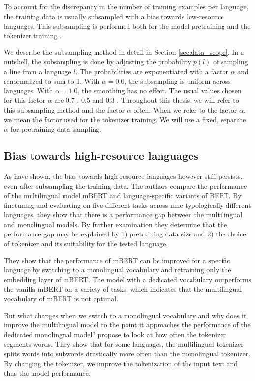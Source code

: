 To account for the discrepancy in the number of training examples per language, the training data is usually subsampled with a bias towards low-resource languages. This subsampling is performed both for the model pretraining and the tokenizer training \cite{devlin_bertmultilingualmd_2019,lample_cross-lingual_2019}.

We describe the subsampling method in detail in Section \ref{sec:data_scope}. In a nutshell, the subsampling is done by adjusting the probability $p(l)$ of sampling a line from a language $l$. The probabilities are exponentiated with a factor $\alpha$ and renormalized to sum to 1. With $\alpha=0.0$, the subsampling is uniform across languages. With $\alpha=1.0$, the smoothing has no effect. The usual values chosen for this factor $\alpha$ are 0.7 \cite{devlin_bert_2019}. 0.5 \cite{lample_cross-lingual_2019} and 0.3 \cite{conneau_unsupervised_2020}. Throughout this thesis, we will refer to this subsampling method and the factor $\alpha$ often. When we refer to the factor $\alpha$, we mean the factor used for the tokenizer training. We will use a fixed, separate $\alpha$ for pretraining data sampling.

\subsection{Bias towards high-resource languages}

As \citet{rust_how_2021} have shown, the bias towards high-resource languages however still persists, even after subsampling the training data. The authors compare the performance of the multilingual model mBERT and language-specific variants of BERT. By finetuning and evaluating on five different tasks across nine typologically different languages, they show that there is a performance gap between the multilingual and monolingual models. By further examination they determine that the performance gap may be explained by 1) pretraining data size and 2) the choice of tokenizer and its suitability for the tested language. 

They show that the performance of mBERT can be improved for a specific language by switching to a monolingual vocabulary and retraining only the embedding layer of mBERT. The model with a dedicated vocabulary outperforms the vanilla mBERT on a variety of tasks, which indicates that the multilingual vocabulary of mBERT is not optimal. 

But what changes when we switch to a monolingual vocabulary and why does it improve the multilingual model to the point it approaches the performance of the dedicated monolingual model? \citet{rust_how_2021} propose to look at how often the tokenizer segments words. They show that for some languages, the multilingual tokenizer splits words into subwords drastically more often than the monolingual tokenizer. By changing the tokenizer, we improve the tokenization of the input text and thus the model performance.

